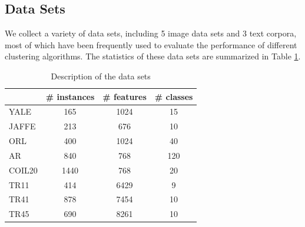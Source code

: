 \documentclass{article}
\begin{document}
\subsection{Data Sets}
We collect a variety of data sets, including 5 image data sets and 3 text corpora, most of which have been frequently used to evaluate the performance of different clustering algorithms. The statistics of these data sets are summarized in Table \ref{data}.

\begin{table}[h]
\centering
\caption{Description of the data sets}
\label{data}
\begin{tabular}{|l|c|c|c|}
\hline
&\textrm{\# instances}&\textrm{\# features}&\textrm{\# classes}\\\hline
\textrm{YALE}&165&1024&15\\\hline
\textrm{JAFFE}&213&676&10\\\hline
\textrm{ORL}&400&1024&40\\\hline
\textrm{AR}&840&768&120\\\hline
\textrm{COIL20}&1440&768&20\\\hline
\textrm{TR11}&414&6429&9\\\hline
\textrm{TR41}&878&7454&10\\\hline
\textrm{TR45}&690&8261&10\\\hline
\end{tabular}
\end{table}
\end{document}
